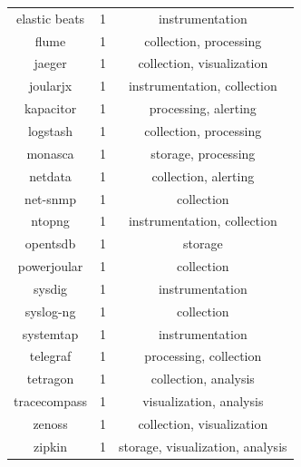 \documentclass[sigconf]{acmart}
\begin{document}
\begin{table}[!htbp]
\begin{tabular}{c c c}
  elastic beats & 1 & instrumentation \\
  flume & 1 & collection, processing \\
  jaeger & 1 & collection, visualization \\
  joularjx & 1 & instrumentation, collection \\
  kapacitor & 1 & processing, alerting \\
  logstash & 1 & collection, processing \\
  monasca & 1 & storage, processing \\
  netdata & 1 & collection, alerting \\
  net-snmp & 1 & collection \\
  ntopng & 1 & instrumentation, collection \\
  opentsdb & 1 & storage \\
  powerjoular & 1 & collection \\
  sysdig & 1 & instrumentation \\
  syslog-ng & 1 & collection \\
  systemtap & 1 & instrumentation \\
  telegraf & 1 & processing, collection \\
  tetragon & 1 & collection, analysis \\
  tracecompass & 1 & visualization, analysis \\
  zenoss & 1 & collection, visualization \\
  zipkin & 1 & storage, visualization, analysis \\
  \hline
  \end{tabular}
  \smallskip
\end{table}
\end{document}
